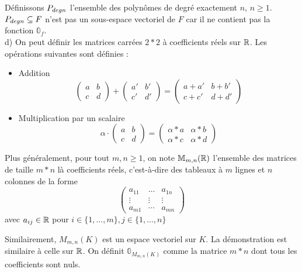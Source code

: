 \documentclass[12pt]{article}
\begin{document}
Définissons $P_{deg \space n}$ l'ensemble des polynômes de degré exactement $n$, $n \geq 1$.
$P_{deg \space n} \subseteq F$ n'est pas un sous-espace vectoriel de $F$ car il ne contient pas la fonction $\mathbb 0_f$.
\\
d) On peut définir les matrices carrées $2*2$ à coefficients réels sur $\mathbb{R}$. Les opérations suivantes sont définies :
\begin{itemize}
    \item Addition
    $$
    \begin{pmatrix}
    a & b \\ c & d
    \end{pmatrix} +\begin{pmatrix}
    a' & b' \\ c' & d'
    \end{pmatrix} = \begin{pmatrix}
    a+a' & b+b' \\ c+c' & d+d'
    \end{pmatrix}$$
    \item  Multiplication par un scalaire
    $$
    \alpha \cdot \begin{pmatrix}
    a & b \\ c & d
    \end{pmatrix} = \begin{pmatrix}
    \alpha * a &  \alpha *b \\ \alpha*c & \alpha*d
    \end{pmatrix}
    $$
\end{itemize}
Plus généralement, pour tout $m,n \geq 1$, on note $\mathbb M_{m,n}(\mathbb{R})$ l'ensemble des matrices de taille $m*n$ là coefficients réels, c'est-à-dire des tableaux à $m$ lignes et $n$ colonnes de la forme
$$\begin{pmatrix}
a_{11} & \dots & a_{1n} \\ \vdots & \vdots & \vdots
\\
a_{m1} & \cdots & a_{mn}
\end{pmatrix} 
$$
avec $a_{ij} \in \mathbb{R}$ pour $i \in \{1, \dots, m\}, j \in \{1, \dots, n\}$ 

Similairement, $M_{m,n}(K)$ est un espace vectoriel sur $K$. La démonstration est similaire à celle sur $\mathbb{R}$.
On définit $\mathbb 0_{M_{m,n}(K)}$ comme la matrice $m*n$ dont tous les coefficients sont nuls. \\
\end{document}
